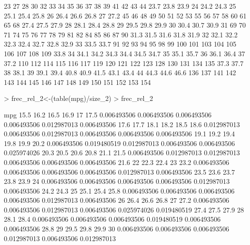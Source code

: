 \documentclass[a4paper]{article}
\begin{document}
\begin{Schunk}
\begin{Soutput}
  23   27   28   30   32   33   34   35   36   37   38   39   41   42   43   44 
23.7 23.8 23.9   24 24.2 24.3   25 25.1 25.4 25.8   26 26.4 26.6 26.8   27 27.2 
  45   46   48   49   50   51   52   53   55   56   57   58   60   61   65   68 
27.4 27.5 27.9   28 28.1 28.4 28.8   29 29.5 29.8 29.9   30 30.4 30.7 30.9   31 
  69   70   71   74   75   76   77   78   79   81   82   84   85   86   87   90 
31.3 31.5 31.6 31.8 31.9   32 32.1 32.2 32.3 32.4 32.7 32.8 32.9   33 33.5 33.7 
  91   92   93   94   95   98   99  100  101  103  104  105  106  107  108  109 
33.8   34 34.1 34.2 34.3 34.4 34.5 34.7   35 35.1 35.7   36 36.1 36.4   37 37.2 
 110  112  114  115  116  117  119  120  121  122  123  128  130  131  134  135 
37.3 37.7   38 38.1   39 39.1 39.4 40.8 40.9 41.5 43.1 43.4   44 44.3 44.6 46.6 
 136  137  141  142  143  144  145  146  147  148  149  150  151  152  153  154 
\end{Soutput}
\begin{Sinput}
> frec_rel_2<-(table(mpg)/size_2)
> frec_rel_2
\end{Sinput}
\begin{Soutput}
mpg
       15.5        16.2        16.5        16.9          17        17.5 
0.006493506 0.006493506 0.006493506 0.006493506 0.012987013 0.006493506 
       17.6        17.7        18.1        18.2        18.5        18.6 
0.012987013 0.006493506 0.012987013 0.006493506 0.006493506 0.006493506 
       19.1        19.2        19.4        19.8        19.9        20.2 
0.006493506 0.019480519 0.012987013 0.006493506 0.006493506 0.025974026 
       20.3        20.5        20.6        20.8        21.1        21.5 
0.006493506 0.012987013 0.012987013 0.006493506 0.006493506 0.006493506 
       21.6          22        22.3        22.4          23        23.2 
0.006493506 0.006493506 0.006493506 0.006493506 0.012987013 0.006493506 
       23.5        23.6        23.7        23.8        23.9          24 
0.006493506 0.006493506 0.006493506 0.006493506 0.012987013 0.006493506 
       24.2        24.3          25        25.1        25.4        25.8 
0.006493506 0.006493506 0.006493506 0.006493506 0.012987013 0.006493506 
         26        26.4        26.6        26.8          27        27.2 
0.006493506 0.006493506 0.012987013 0.006493506 0.025974026 0.019480519 
       27.4        27.5        27.9          28        28.1        28.4 
0.006493506 0.006493506 0.006493506 0.019480519 0.006493506 0.006493506 
       28.8          29        29.5        29.8        29.9          30 
0.006493506 0.006493506 0.006493506 0.012987013 0.006493506 0.012987013 

\end{Soutput}
\end{Schunk}
\end{document}
